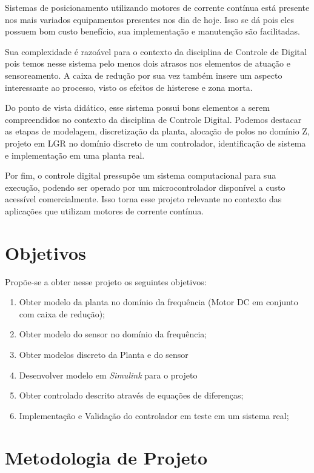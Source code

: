 \documentclass[a4paper,11pt]{article}
\begin{document}
Sistemas de posicionamento utilizando motores de corrente contínua está presente nos mais variados equipamentos presentes nos dia de hoje. Isso se dá pois eles possuem bom custo benefício, sua implementação e manutenção são facilitadas.

Sua complexidade é razoável para o contexto da disciplina de Controle de Digital pois temos nesse sistema pelo menos dois atrasos nos elementos de atuação e sensoreamento. A caixa de redução por sua vez também insere um aspecto interessante ao processo, visto os efeitos de histerese e zona morta.

Do ponto de vista didático, esse sistema possui bons elementos a serem compreendidos no contexto da disciplina de Controle Digital. Podemos destacar as etapas de modelagem, discretização da planta, alocação de polos no domínio Z, projeto em LGR no domínio discreto de um controlador, identificação de sistema e implementação em uma planta real.

Por fim, o controle digital pressupõe um sistema computacional para sua execução, podendo ser operado por um microcontrolador disponível a custo acessível comercialmente. Isso torna esse projeto relevante no contexto das aplicações que utilizam motores de corrente contínua.


\section{Objetivos}

Propõe-se a obter nesse projeto os seguintes objetivos:

 \begin{enumerate}
   \item Obter modelo da planta no domínio da frequência (Motor DC em conjunto com caixa de redução);
   \item Obter modelo do sensor no domínio da frequência;
   \item Obter modelos discreto da Planta e do sensor
   \item Desenvolver modelo em \textit{Simulink} para o projeto
   \item Obter controlado descrito através de equações de diferenças;
   \item Implementação e Validação do controlador em teste em um sistema real;
 \end{enumerate}

\section{Metodologia de Projeto}
\end{document}
